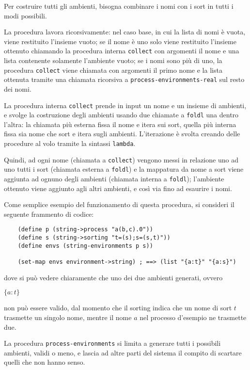 Per costruire tutti gli ambienti, bisogna combinare i nomi con i sort
in tutti i modi possibili.

La procedura lavora ricorsivamente: nel caso base, in cui la lista di
nomi \`e vuota, viene restituito l'insieme vuoto; se il nome \`e uno solo
viene restituito l'insieme ottenuto chiamando la procedura interna
\lstinline{collect} con argomenti il nome e una lista contenente
solamente l'ambiente vuoto; se i nomi sono pi\`u di uno, la procedura
\lstinline{collect} viene chiamata con argomenti il primo nome e la
lista ottenuta tramite una chiamata ricorsiva a
\lstinline{process-environments-real} sul resto dei nomi.

La procedura interna \lstinline{collect} prende in input un nome e un
insieme di ambienti, e svolge la costruzione degli ambienti usando due
chiamate a \lstinline{foldl} una dentro l'altra: la chiamata pi\`u
esterna fissa il nome e itera sui sort, quella pi\`u interna fissa sia
nome che sort e itera sugli ambienti. L'iterazione \`e svolta creando
delle procedure al volo tramite la sintassi \lstinline{lambda}.

Quindi, ad ogni nome (chiamata a \lstinline{collect}) vengono messi in
relazione uno ad uno tutti i sort (chiamata esterna a \lstinline{foldl})
e la mappatura da nome a sort viene aggiunta ad ognuno degli ambienti
(chiamata interna a \lstinline{foldl}); l'ambiente ottenuto viene
aggiunto agli altri ambienti, e cos\`i via fino ad esaurire i nomi.

Come semplice esempio del funzionamento di questa procedura, si
consideri il seguente frammento di codice:

\begin{lstlisting}
    (define p (string->process "a(b,c).0"))
    (define s (string->sorting "t=(s);s=(s,t)"))
    (define envs (string-environments p s))

    (set-map envs environment->string) ; ==> (list "{a:t}" "{a:s}")
\end{lstlisting}

dove si pu\`o vedere chiaramente che uno dei due ambienti generati,
ovvero

\begin{pilisting}
$
    \{a:t\}
$
\end{pilisting}

non pu\`o essere valido, dal momento che il sorting indica che un nome
di sort $t$ trasmette un singolo nome, mentre il nome $a$ nel processo
d'esempio ne trasmette due.

La procedura \lstinline{process-environments} si limita a generare tutti
i possibili ambienti, validi o meno, e lascia ad altre parti del sistema
il compito di scartare quelli che non hanno senso.
